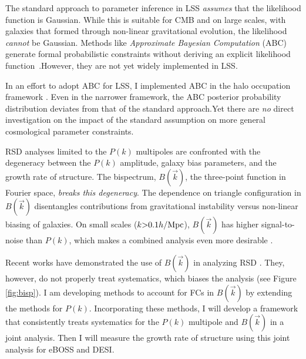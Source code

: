 The standard approach to parameter inference in LSS {\em assumes} that the likelihood function is Gaussian. While this is suitable for CMB and on large scales, with galaxies that formed through non-linear gravitational evolution, the likelihood {\em cannot} be Gaussian. Methods like {\em Approximate Bayesian Computation} (ABC) generate formal probabilistic constraints without deriving an explicit likelihood function~\citep[\emph{e.g.}][]{Weyant}.However, they are not yet widely implemented in LSS. 

In an effort to adopt ABC for LSS, I implemented ABC in the halo occupation framework \citep{abc}. Even in the narrower framework, the ABC posterior probability distribution deviates from that of  the standard approach.Yet there are {\em no} direct investigation on the impact of the standard assumption on more general cosmological parameter constraints. 


RSD analyses limited to the $P(k)$ multipoles are confronted with the degeneracy between the $P(k)$ amplitude, galaxy bias parameters, and the growth rate of structure. %
The bispectrum, $B(\vec{k})$, the three-point function in Fourier space, {\em breaks this degeneracy}.
The dependence on triangle configuration in $B(\vec{k})$ disentangles contributions from gravitational instability versus non-linear biasing of galaxies. 
On small scales ($k {>} 0.1h/{\rm Mpc}$), $B(\vec{ k})$ has higher signal-to-noise than $P(k)$, which makes a combined analysis even more desirable \citep{sefusatti_bisp1}.%

Recent works have demonstrated the use of $B(\vec{k})$ in analyzing RSD \citep{gm_bisp2015, gm_bisp2016}. 
They, however, do not properly treat systematics, which biases the analysis (see Figure \ref{fig:bisp}). 
I am developing methods to account for FCs in $B(\vec{k})$ by extending the methods for $P(k)$. 
Incorporating these methods, I will develop a framework that consistently treats systematics for the $P(k)$ multipole and $B(\vec{k})$ in a joint analysis. 
Then I will measure the growth rate of structure using this joint analysis for eBOSS and DESI. 

